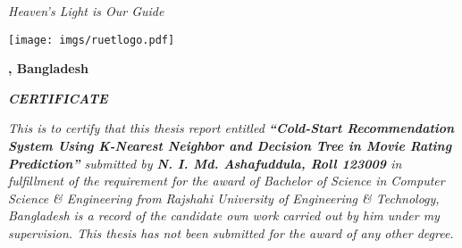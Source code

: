 \documentclass[document.tex]{subfiles}
\begin{document}
	
	
	\begin{center}
		\textit{Heaven's Light is Our Guide}
		\vspace{1cm}
		
		\texttt{[image: imgs/ruetlogo.pdf]}
		
		\vspace{1cm}
		\textbf{{\fontsize{12pt}{0.5cm} \selectfont \dept}}
		
		\vspace{0.5cm}
		\textbf{{\fontsize{14pt}{0.5cm}\selectfont \ruet, Bangladesh}}
		
		\vspace{1cm}
		\textbf{{\fontsize{16pt}{0.5cm}\selectfont \textit{CERTIFICATE}}}
		
		\vspace{.5cm}
		
	\end{center}
	
	\noindent \textit{This is to certify that this thesis report entitled \textbf{“Cold-Start Recommendation System Using K-Nearest Neighbor and Decision Tree in Movie Rating Prediction”} submitted by \textbf{N. I. Md. Ashafuddula, Roll 123009} in fulfillment of the requirement for the award of Bachelor of Science in Computer Science \& Engineering from Rajshahi University of Engineering \& Technology, Bangladesh is a record of the candidate own work carried out by him under my supervision. This thesis has not been submitted for the award of any other degree.}
	
\end{document}
